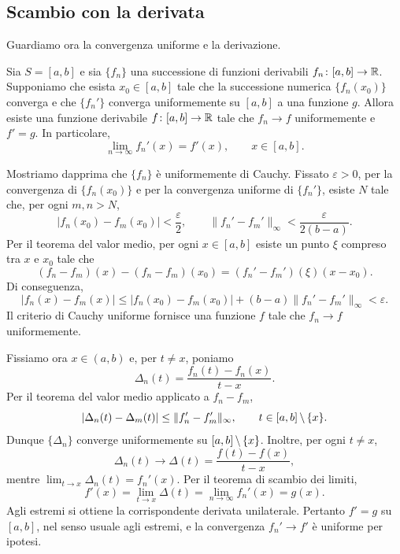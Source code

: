 \documentclass[a4paper]{article}
\begin{document}
\subsection{Scambio con la derivata}

\begin{radioactive}
Guardiamo ora la convergenza uniforme e la derivazione.
\end{radioactive}

\begin{radioactive}
\begin{snippettheorem}{}
    Sia \(S=[a,b]\) e sia \(\{f_n\}\) una successione di funzioni derivabili
    \(f_n\colon[a,b]\to\mathbb{R}\). Supponiamo che esista \(x_0\in[a,b]\)
    tale che la successione numerica \(\{f_n(x_0)\}\) converga e che
    \(\{f_n'\}\) converga uniformemente su \([a,b]\) a una funzione \(g\).
    Allora esiste una funzione derivabile \(f\colon[a,b]\to\mathbb{R}\) tale che
    \(f_n\to f\) uniformemente e \(f'=g\). In particolare,
    \[
        \lim_{n\to\infty}f_n'(x)=f'(x),
        \qquad x\in[a,b].
    \]
\end{snippettheorem}
\end{radioactive}

\begin{radioactive}
\begin{snippetproof}{}
    Mostriamo dapprima che \(\{f_n\}\) è uniformemente di Cauchy. Fissato
    \(\varepsilon>0\), per la convergenza di \(\{f_n(x_0)\}\) e per la convergenza
    uniforme di \(\{f_n'\}\), esiste \(N\) tale che, per ogni \(m,n>N\),
    \[
        |f_n(x_0)-f_m(x_0)|<\frac{\varepsilon}{2},
        \qquad
        \lVert f_n'-f_m'\rVert_\infty<\frac{\varepsilon}{2(b-a)}.
    \]
    Per il teorema del valor medio, per ogni \(x\in[a,b]\) esiste un punto
    \(\xi\) compreso tra \(x\) e \(x_0\) tale che
    \[
        (f_n-f_m)(x)-(f_n-f_m)(x_0)
        =(f_n'-f_m')(\xi)(x-x_0).
    \]
    Di conseguenza,
    \[
        |f_n(x)-f_m(x)|
        \leq |f_n(x_0)-f_m(x_0)|+(b-a)\lVert f_n'-f_m'\rVert_\infty
        <\varepsilon.
    \]
    Il criterio di Cauchy uniforme fornisce una funzione \(f\) tale che
    \(f_n\to f\) uniformemente.

    Fissiamo ora \(x\in(a,b)\) e, per \(t\neq x\), poniamo
    \[
        \Delta_n(t)=\frac{f_n(t)-f_n(x)}{t-x}.
    \]
    Per il teorema del valor medio applicato a \(f_n-f_m\),
    \[
        |\Delta_n(t)-\Delta_m(t)|
        \leq \lVert f_n'-f_m'\rVert_\infty,
        \qquad t\in[a,b]\,\backslash\,\{x\}.
    \]
    Dunque \(\{\Delta_n\}\) converge uniformemente su
    \([a,b]\,\backslash\,\{x\}\). Inoltre, per ogni \(t\neq x\),
    \[
        \Delta_n(t)\longrightarrow
        \Delta(t)=\frac{f(t)-f(x)}{t-x},
    \]
    mentre \(\lim_{t\to x}\Delta_n(t)=f_n'(x)\). Per il teorema di scambio dei limiti,
    \[
        f'(x)=\lim_{t\to x}\Delta(t)
        =\lim_{n\to\infty}f_n'(x)=g(x).
    \]
    Agli estremi si ottiene la corrispondente derivata unilaterale. Pertanto \(f'=g\)
    su \([a,b]\), nel senso usuale agli estremi, e la convergenza \(f_n'\to f'\)
    è uniforme per ipotesi.
\end{snippetproof}
\end{radioactive}
\end{document}
